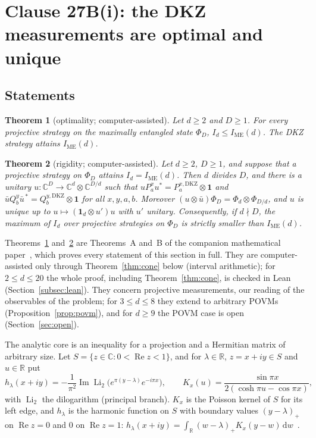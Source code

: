 \documentclass[11pt]{article}
\newtheorem{theorem}{Theorem}
\theoremstyle{remark}
\numberwithin{equation}{section}
\newcommand{\R}{\mathbb{R}}
\newcommand{\C}{\mathbb{C}}
\renewcommand{\Re}{\operatorname{Re}}
\renewcommand{\Im}{\operatorname{Im}}
\newcommand{\Li}{\operatorname{Li}_2}
\newcommand{\IME}{I_{\mathrm{ME}}}
\newcommand{\one}{\mathbf{1}}
\newcommand{\dd}{\,\mathrm{d}}
\newcommand{\DKZ}{\mathrm{DKZ}}
\begin{document}
\section{Clause 27B(i): the DKZ measurements are optimal and unique}\label{sec:27Bi}

\subsection{Statements}\label{subsec:statements}

\begin{theorem}[optimality; computer-assisted]\label{thm:opt}
Let $d\ge2$ and $D\ge1$. For every projective strategy on the maximally entangled state $\Phi_D$, $I_d\le\IME(d)$. The
DKZ strategy attains $\IME(d)$.
\end{theorem}

\begin{theorem}[rigidity; computer-assisted]\label{thm:rig}
Let $d\ge2$, $D\ge1$, and suppose that a projective strategy on $\Phi_D$ attains $I_d=\IME(d)$. Then $d$ divides $D$,
and there is a unitary $u\colon\C^D\to\C^d\otimes\C^{D/d}$ such that $uP^x_au^*=P^{x,\DKZ}_a\otimes\one$ and
$\bar uQ^y_b\bar u^{\,*}=Q^{y,\DKZ}_b\otimes\one$ for all $x,y,a,b$. Moreover $(u\otimes\bar u)\Phi_D=\Phi_d\otimes\Phi_{D/d}$,
and $u$ is unique up to $u\mapsto(\one_d\otimes u')u$ with $u'$ unitary. Consequently, if $d\nmid D$, the maximum of
$I_d$ over projective strategies on $\Phi_D$ is strictly smaller than $\IME(d)$.
\end{theorem}

Theorems~\ref{thm:opt} and~\ref{thm:rig} are Theorems~A and~B of the companion mathematical paper~\cite{MSmath}, which
proves every statement of this section in full. They are computer-assisted only through Theorem~\ref{thm:cone} below
(interval arithmetic); for $2\le d\le20$ the whole proof, including Theorem~\ref{thm:cone}, is checked in Lean
(Section~\ref{subsec:lean}). They concern projective measurements, our reading of the observables of the problem; for
$3\le d\le8$ they extend to arbitrary POVMs (Proposition~\ref{prop:povm}), and for $d\ge9$ the POVM case is open
(Section~\ref{sec:open}).

The analytic core is an inequality for a projection and a Hermitian matrix of arbitrary size. Let
$S=\{z\in\C:0<\Re z<1\}$, and for $\lambda\in\R$, $z=x+iy\in S$ and $u\in\R$ put
\begin{equation}\label{eq:hK}
h_\lambda(x+iy)=-\frac1{\pi^2}\Im\Li\bigl(e^{\pi(y-\lambda)}e^{-i\pi x}\bigr),\qquad
K_x(u)=\frac{\sin\pi x}{2(\cosh\pi u-\cos\pi x)},
\end{equation}
with $\Li$ the dilogarithm (principal branch). $K_x$ is the Poisson kernel of $S$ for its left edge, and $h_\lambda$ is
the harmonic function on $S$ with boundary values $(y-\lambda)_+$ on $\Re z=0$ and $0$ on $\Re z=1$:
$h_\lambda(x+iy)=\int_\R(w-\lambda)_+K_x(y-w)\dd w$~\cite[Lemmas~3.1 and~3.2]{MSmath}.
\end{document}
